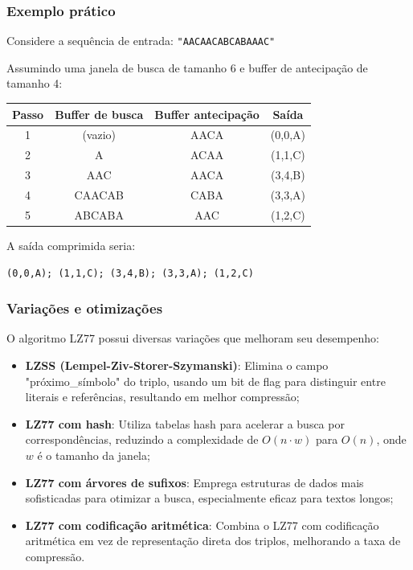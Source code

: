 \subsubsection{Exemplo prático}

Considere a sequência de entrada: \texttt{"AACAACABCABAAAC"}

Assumindo uma janela de busca de tamanho 6 e buffer de antecipação de tamanho 4:

\begin{center}
\begin{tabular}{cccc}
\toprule
Passo & Buffer de busca & Buffer antecipação & Saída \\
\midrule
1 & (vazio) & AACA & (0,0,A) \\
2 & A & ACAA & (1,1,C) \\
3 & AAC & AACA & (3,4,B) \\
4 & CAACAB & CABA & (3,3,A) \\
5 & ABCABA & AAC & (1,2,C) \\
\bottomrule
\end{tabular}
\end{center}

A saída comprimida seria: 

\texttt{(0,0,A); (1,1,C); (3,4,B); (3,3,A); (1,2,C)}

\subsubsection{Variações e otimizações}

O algoritmo LZ77 possui diversas variações que melhoram seu desempenho:

\begin{itemize}
    \item \textbf{LZSS (Lempel-Ziv-Storer-Szymanski)}: Elimina o campo "próximo\_símbolo" do triplo, usando um bit de flag para distinguir entre literais e referências, resultando em melhor compressão;
    
    \item \textbf{LZ77 com hash}: Utiliza tabelas hash para acelerar a busca por correspondências, reduzindo a complexidade de $O(n \cdot w)$ para $O(n)$, onde $w$ é o tamanho da janela;
    
    \item \textbf{LZ77 com árvores de sufixos}: Emprega estruturas de dados mais sofisticadas para otimizar a busca, especialmente eficaz para textos longos;
    
    \item \textbf{LZ77 com codificação aritmética}: Combina o LZ77 com codificação aritmética em vez de representação direta dos triplos, melhorando a taxa de compressão.
\end{itemize}

